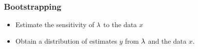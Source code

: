 \begin{frame}
  \frametitle{Bootstrapping}
  \begin{itemize}
  \item Estimate the sensitivity of $\lambda$ to the data $x$
  \item Obtain a distribution of estimates $y$ from $\lambda$ and the data $x$.
  \end{itemize}
\end{frame}

